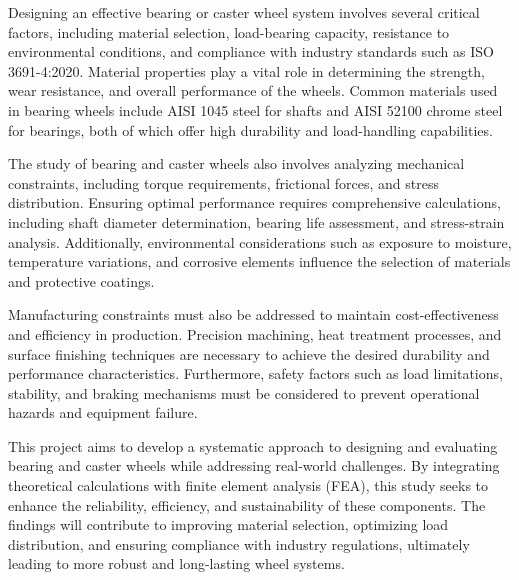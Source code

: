 \documentclass[../../main]{subfiles}
\begin{document}
Designing an effective bearing or caster wheel system involves several
critical factors, including material selection, load-bearing capacity,
resistance to environmental conditions, and compliance with industry
standards such as ISO 3691-4:2020. Material properties play a vital role
in determining the strength, wear resistance, and overall performance of
the wheels. Common materials used in bearing wheels include AISI 1045
steel for shafts and AISI 52100 chrome steel for bearings, both of which
offer high durability and load-handling capabilities.

The study of bearing and caster wheels also involves analyzing
mechanical constraints, including torque requirements, frictional
forces, and stress distribution. Ensuring optimal performance requires
comprehensive calculations, including shaft diameter determination,
bearing life assessment, and stress-strain analysis. Additionally,
environmental considerations such as exposure to moisture, temperature
variations, and corrosive elements influence the selection of materials
and protective coatings.

Manufacturing constraints must also be addressed to maintain
cost-effectiveness and efficiency in production. Precision machining,
heat treatment processes, and surface finishing techniques are necessary
to achieve the desired durability and performance characteristics.
Furthermore, safety factors such as load limitations, stability, and
braking mechanisms must be considered to prevent operational hazards and
equipment failure.

This project aims to develop a systematic approach to designing and
evaluating bearing and caster wheels while addressing real-world
challenges. By integrating theoretical calculations with finite element
analysis (FEA), this study seeks to enhance the reliability, efficiency,
and sustainability of these components. The findings will contribute to
improving material selection, optimizing load distribution, and ensuring
compliance with industry regulations, ultimately leading to more robust
and long-lasting wheel systems.

\subsection{}\label{section}

\subsection{}\label{section-1}
\end{document}
